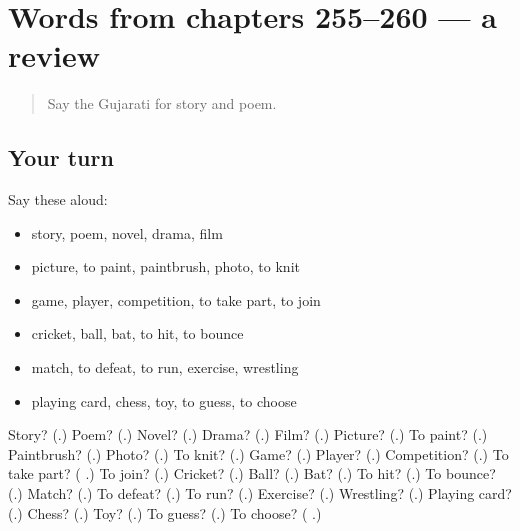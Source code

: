 \section[(dialogue)]{Words from chapters 255–260 — a review}

\label{lesson:GU-R260-review-255-260}



\begin{quote}
Say the Gujarati for story and poem.
\end{quote}

\subsection*{Your turn}
Say these aloud:

\begin{itemize}
\raggedright
  \item story, poem, novel, drama, film
  \item picture, to paint, paintbrush, photo, to knit
  \item game, player, competition, to take part, to join
  \item cricket, ball, bat, to hit, to bounce
  \item match, to defeat, to run, exercise, wrestling
  \item playing card, chess, toy, to guess, to choose
\end{itemize}

\begin{tcolorbox}[breakable,colback=teal!4,colframe=teal!35!black,title={Before you move on}]
Story? (\textbf{}.) Poem? (\textbf{}.) Novel? (\textbf{}.) Drama? (\textbf{}.) Film? (\textbf{}.) Picture? (\textbf{}.) To paint? (\textbf{}.) Paintbrush? (\textbf{}.) Photo? (\textbf{}.) To knit? (\textbf{}.) Game? (\textbf{}.) Player? (\textbf{}.) Competition? (\textbf{}.) To take part? (\textbf{ }.) To join? (\textbf{}.) Cricket? (\textbf{}.) Ball? (\textbf{}.) Bat? (\textbf{}.) To hit? (\textbf{}.) To bounce? (\textbf{}.) Match? (\textbf{}.) To defeat? (\textbf{}.) To run? (\textbf{}.) Exercise? (\textbf{}.) Wrestling? (\textbf{}.) Playing card? (\textbf{}.) Chess? (\textbf{}.) Toy? (\textbf{}.) To guess? (\textbf{}.) To choose? (\textbf{ }.)
\end{tcolorbox}
